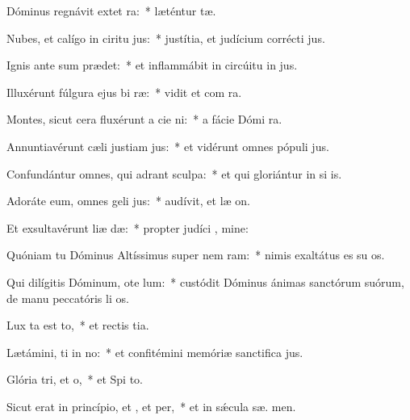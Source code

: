 \item Dóminus regnávit extet ra:~* læténtur  tæ.
\item Nubes, et calígo in ciritu jus:~* justítia, et judícium corrécti  jus.
\item Ignis ante sum prædet:~* et inflammábit in circúitu in jus.
\item Illuxérunt fúlgura ejus bi ræ:~* vidit et com  ra.
\item Montes, sicut cera fluxérunt a cie ni:~* a fácie Dómi  ra.
\item Annuntiavérunt cæli justiam jus:~* et vidérunt omnes pópuli  jus.
\item Confundántur omnes, qui adrant sculpa:~* et qui gloriántur in si is.
\item Adoráte eum, omnes geli jus:~* audívit, et læ  on.
\item Et exsultavérunt liæ dæ:~* propter judíci , mine:
\item Quóniam tu Dóminus Altíssimus super nem ram:~* nimis exaltátus es su  os.
\item Qui dilígitis Dóminum, ote lum:~* custódit Dóminus ánimas sanctórum suórum, de manu peccatóris li os.
\item Lux ta est to,~* et rectis  tia.
\item Lætámini, ti in no:~* et confitémini memóriæ sanctifica jus.
\item Glória tri, et o,~* et Spi to.
\item Sicut erat in princípio, et , et per,~* et in sǽcula sæ. men.
